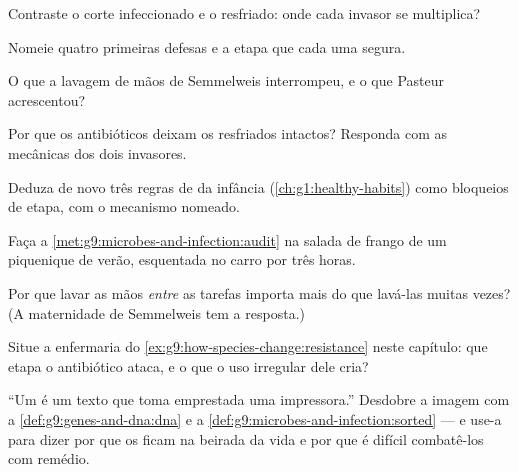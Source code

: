 \begin{exercise}[$\star$]\label{exo:g9:microbes-and-infection:4}
Contraste o corte infeccionado e o resfriado: onde cada
invasor se multiplica?
\end{exercise}

\begin{exercise}[$\star$]\label{exo:g9:microbes-and-infection:5}
Nomeie quatro primeiras defesas e a etapa que cada uma segura.
\end{exercise}

\begin{exercise}[$\star$]\label{exo:g9:microbes-and-infection:6}
O que a lavagem de mãos de Semmelweis interrompeu, e o que
Pasteur acrescentou?
\end{exercise}

\begin{exercise}[$\star\star$]\label{exo:g9:microbes-and-infection:7}
Por que os antibióticos deixam os resfriados intactos?
Responda com as mecânicas dos dois invasores.
\end{exercise}

\begin{exercise}[$\star\star$]\label{exo:g9:microbes-and-infection:8}
Deduza de novo três regras de  da infância
(\cref{ch:g1:healthy-habits}) como bloqueios de etapa, com o
mecanismo nomeado.
\end{exercise}

\begin{exercise}[$\star\star$]\label{exo:g9:microbes-and-infection:9}
Faça a \cref{met:g9:microbes-and-infection:audit} na salada
de frango de um piquenique de verão, esquentada no carro por
três horas.
\end{exercise}

\begin{exercise}[$\star\star$]\label{exo:g9:microbes-and-infection:10}
Por que lavar as mãos \emph{entre} as tarefas importa mais do
que lavá-las muitas vezes? (A maternidade de Semmelweis tem a
resposta.)
\end{exercise}

\begin{exercise}[$\star\star$]\label{exo:g9:microbes-and-infection:11}
Situe a enfermaria do
\cref{ex:g9:how-species-change:resistance} neste capítulo:
que etapa o antibiótico ataca, e o que o uso irregular dele
cria?
\end{exercise}

\begin{exercise}[$\star\star\star$]\label{exo:g9:microbes-and-infection:12}
``Um  é um texto que toma emprestada uma impressora.''
Desdobre a imagem com a \cref{def:g9:genes-and-dna:dna} e a
\cref{def:g9:microbes-and-infection:sorted} --- e use-a para
dizer por que os  ficam na beirada da vida e por que é
difícil combatê-los com remédio.
\end{exercise}

